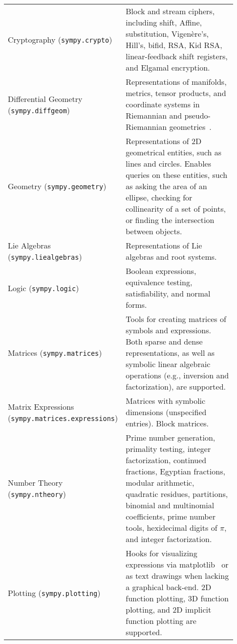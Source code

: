 \begin{longtable}[htbc]{>{\raggedright}p{0.30\linewidth}p{0.63\linewidth}}
Cryptography (\texttt{sympy.crypto}) & Block and stream ciphers, including shift, Affine,
substitution, Vigen\`{e}re's, Hill's, bifid, RSA, Kid RSA,
linear-feedback shift registers, and Elgamal encryption.\\

Differential Geometry (\texttt{sympy.diffgeom}) & Representations of manifolds, metrics, tensor
products, and coordinate systems in Riemannian and pseudo-Riemannian
geometries~\cite{FunctionalDifferentialGeometry}.\\

Geometry (\texttt{sympy.geometry}) & Representations of 2D geometrical entities, such as lines and
circles. Enables queries on these entities, such as asking the area of an
ellipse, checking for collinearity of a set of
points, or finding the intersection between objects.\\

Lie Algebras (\texttt{sympy.liealgebras}) & Representations of Lie algebras and root systems.\\

Logic (\texttt{sympy.logic}) & Boolean expressions, equivalence testing, satisfiability, and normal
forms.\\

Matrices (\texttt{sympy.matrices}) & Tools for creating matrices of symbols and expressions.
Both sparse and dense representations, as well as symbolic linear
algebraic operations (e.g., inversion and factorization), are
supported.\\

Matrix Expressions (\texttt{sympy.matrices.expressions}) & Matrices with symbolic dimensions (unspecified entries).
Block matrices.\\

Number Theory (\texttt{sympy.ntheory}) & Prime number generation, primality testing, integer
factorization, continued fractions, Egyptian fractions, modular arithmetic,
quadratic residues, partitions, binomial and multinomial coefficients,
prime number tools, hexidecimal digits of $\pi$, and integer factorization. \\

Plotting (\texttt{sympy.plotting}) & Hooks for visualizing expressions via matplotlib~\cite{Hunter:2007}
or as text drawings when lacking a graphical back-end. 2D function plotting,
3D function
plotting, and 2D implicit function plotting are supported.\\


\end{longtable}
